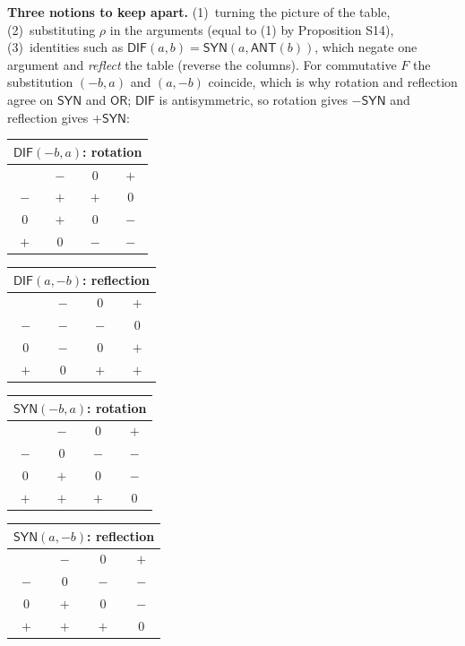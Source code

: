 \documentclass[10pt,a4paper]{article}
\begin{document}
\textbf{Three notions to keep apart.} (1)~turning the picture of the table, (2)~substituting $\rho$ in the arguments (equal to (1) by Proposition S14), (3)~identities such as $\mathsf{DIF}(a,b)=\mathsf{SYN}(a,\mathsf{ANT}(b))$, which negate one argument and \emph{reflect} the table (reverse the columns). For commutative $F$ the substitution $(-b,a)$ and $(a,-b)$ coincide, which is why rotation and reflection agree on $\mathsf{SYN}$ and $\mathsf{OR}$; $\mathsf{DIF}$ is antisymmetric, so rotation gives $-\mathsf{SYN}$ and reflection gives $+\mathsf{SYN}$:
\begin{center}\small \begin{minipage}[t]{3.1cm}\centering \begin{tabular}{c|ccc}\multicolumn{4}{c}{$\mathsf{DIF}(-b,a)$: rotation}\\\hline &$-$&$0$&$+$\\\hline $-$&$+$&$+$&$0$\\$0$&$+$&$0$&$-$\\$+$&$0$&$-$&$-$\\\end{tabular}\end{minipage}\quad \begin{minipage}[t]{3.1cm}\centering \begin{tabular}{c|ccc}\multicolumn{4}{c}{$\mathsf{DIF}(a,-b)$: reflection}\\\hline &$-$&$0$&$+$\\\hline $-$&$-$&$-$&$0$\\$0$&$-$&$0$&$+$\\$+$&$0$&$+$&$+$\\\end{tabular}\end{minipage}\quad \begin{minipage}[t]{3.1cm}\centering \begin{tabular}{c|ccc}\multicolumn{4}{c}{$\mathsf{SYN}(-b,a)$: rotation}\\\hline &$-$&$0$&$+$\\\hline $-$&$0$&$-$&$-$\\$0$&$+$&$0$&$-$\\$+$&$+$&$+$&$0$\\\end{tabular}\end{minipage}\quad \begin{minipage}[t]{3.1cm}\centering \begin{tabular}{c|ccc}\multicolumn{4}{c}{$\mathsf{SYN}(a,-b)$: reflection}\\\hline &$-$&$0$&$+$\\\hline $-$&$0$&$-$&$-$\\$0$&$+$&$0$&$-$\\$+$&$+$&$+$&$0$\\\end{tabular}\end{minipage}\end{center}
\end{document}
